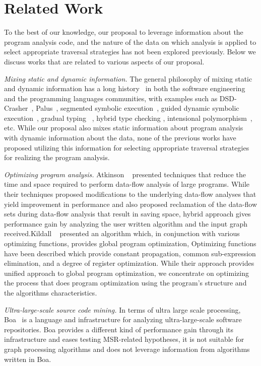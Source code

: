 \chapter{Related Work}
\label{sec:related}

To the best of our knowledge, our proposal to leverage information about the
program analysis code, and the nature of the data on which analysis is applied
to select appropriate traversal strategies has not been explored previously.
Below we discuss works that are related to various aspects of our proposal. 

\emph{Mixing static and dynamic information.} %
The general philosophy of mixing static and dynamic information has a long 
history~\cite{Ernst2003} in both the software engineering and the programming 
languages communities, with examples such as DSD-Crasher~\cite{DSD-Crasher}, 
Palus~\cite{Palus}, segmented symbolic execution~\cite{Le2013}, guided 
dynamic symbolic execution~\cite{Christakis2016}, gradual typing~\cite{Siek07}
, hybrid type checking \cite{Flanagan06}, intensional polymorphism~\cite{Harper95, 
Crary98}, etc. While our proposal also mixes static information 
about program analysis with dynamic information about the data, none of the 
previous works have proposed utilizing this information for selecting 
appropriate traversal strategies for realizing the program analysis.

\emph{Optimizing program analysis.}%
Atkinson ~\cite{atkinson2001implementation} presented techniques that reduce 
the time and space required to perform data-flow analysis of large programs. 
While their techniques proposed modifications to the underlying data-flow 
analyses that yield improvement in performance and also proposed reclamation 
of the data-flow sets during data-flow analysis that result in saving space, 
hybrid approach gives performance gain by analyzing the user written 
algorithm and the input graph received.\newline Kildall ~\cite{kildall1973unified} 
presented an algorithm which, in conjunction with various optimizing 
functions, provides global program optimization, Optimizing functions have 
been described which provide constant propagation, common sub-expression 
elimination, and a degree of register optimization. While their approach 
provides unified approach to global program optimization, we concentrate on 
optimizing the process that does program optimization using the program's 
structure and the algorithms characteristics.

\emph{Ultra-large-scale source code mining.}%
In terms of ultra large scale processing, Boa~\cite{dyer2013boa} is a 
language and infrastructure for analyzing ultra-large-scale software 
repositories. Boa provides a different kind of performance gain through its 
infrastructure and eases testing MSR-related hypotheses, it is not suitable 
for graph processing algorithms and does not leverage information from 
algorithms written in Boa.

